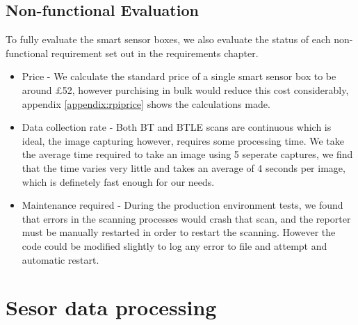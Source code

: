 \documentclass{l4proj}
\begin{document}
\subsection{Non-functional Evaluation}
To fully evaluate the smart sensor boxes, we also evaluate the status of each non-functional requirement set out in the requirements chapter.

\begin{itemize}	
  \item Price - We calculate the standard price of a single smart sensor box to be around £52, however purchising in bulk would reduce this cost considerably, appendix \ref{appendix:rpiprice} shows the calculations made.
  \item Data collection rate - Both BT and BTLE scans are continuous which is ideal, the image capturing however, requires some processing time. We take the average time required to take an image using 5 seperate captures, we find that the time varies very little and takes an average of 4 seconds per image, which is definetely fast enough for our needs. 
  \item Maintenance required - During the production environment tests, we found that errors in the scanning processes would crash that scan, and the reporter must be manually restarted in order to restart the scanning. However the code could be modified slightly to log any error to file and attempt and automatic restart.
\end{itemize}




\section{Sesor data processing}
\end{document}

